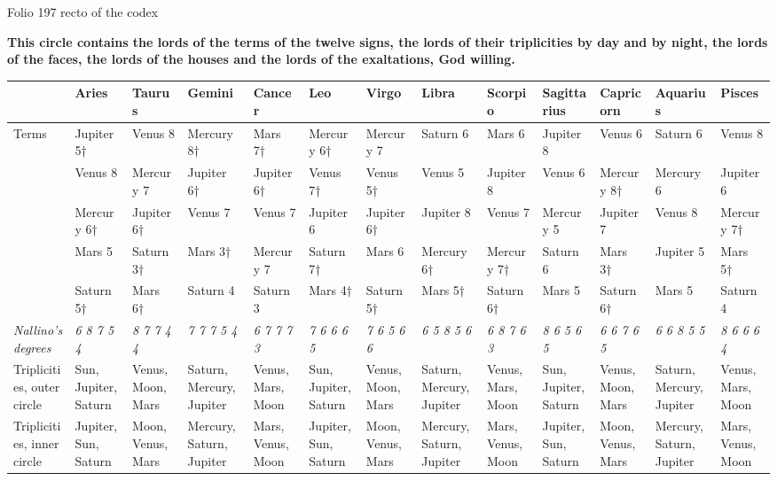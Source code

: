 \begin{landscape}
{\centering\footnotesize Folio 197 recto of the codex\par}\smallskip
{\centering\bfseries This circle contains the lords of the terms of the twelve signs, the lords of their triplicities by day and by night, the lords of the faces, the lords of the houses and the lords of the exaltations, God willing.\par}\medskip
{\footnotesize\setlength{\tabcolsep}{2.5pt}\begin{longtable}{L{30mm}L{15.5mm}L{15.5mm}L{15.5mm}L{15.5mm}L{15.5mm}L{15.5mm}L{15.5mm}L{15.5mm}L{15.5mm}L{15.5mm}L{15.5mm}L{15.5mm}}
& \textbf{Aries} & \textbf{Taurus} & \textbf{Gemini} & \textbf{Cancer} & \textbf{Leo} & \textbf{Virgo} & \textbf{Libra} & \textbf{Scorpio} & \textbf{Sagittarius} & \textbf{Capricorn} & \textbf{Aquarius} & \textbf{Pisces}\\\hline\endhead
Terms & Jupiter 5† & Venus 8 & Mercury 8† & Mars 7† & Mercury 6† & Mercury 7 & Saturn 6 & Mars 6 & Jupiter 8 & Venus 6 & Saturn 6 & Venus 8\\
 & Venus 8 & Mercury 7 & Jupiter 6† & Jupiter 6† & Venus 7† & Venus 5† & Venus 5 & Jupiter 8 & Venus 6 & Mercury 8† & Mercury 6 & Jupiter 6\\
 & Mercury 6† & Jupiter 6† & Venus 7 & Venus 7 & Jupiter 6 & Jupiter 6† & Jupiter 8 & Venus 7 & Mercury 5 & Jupiter 7 & Venus 8 & Mercury 7†\\
 & Mars 5 & Saturn 3† & Mars 3† & Mercury 7 & Saturn 7† & Mars 6 & Mercury 6† & Mercury 7† & Saturn 6 & Mars 3† & Jupiter 5 & Mars 5†\\
 & Saturn 5† & Mars 6† & Saturn 4 & Saturn 3 & Mars 4† & Saturn 5† & Mars 5† & Saturn 6† & Mars 5 & Saturn 6† & Mars 5 & Saturn 4\\
\emph{Nallino's degrees} & \emph{6 8 7 5 4} & \emph{8 7 7 4 4} & \emph{7 7 7 5 4} & \emph{6 7 7 7 3} & \emph{7 6 6 6 5} & \emph{7 6 5 6 6} & \emph{6 5 8 5 6} & \emph{6 8 7 6 3} & \emph{8 6 5 6 5} & \emph{6 6 7 6 5} & \emph{6 6 8 5 5} & \emph{8 6 6 6 4}\\
Triplicities, outer circle & Sun, Jupiter, Saturn & Venus, Moon, Mars & Saturn, Mercury, Jupiter & Venus, Mars, Moon & Sun, Jupiter, Saturn & Venus, Moon, Mars & Saturn, Mercury, Jupiter & Venus, Mars, Moon & Sun, Jupiter, Saturn & Venus, Moon, Mars & Saturn, Mercury, Jupiter & Venus, Mars, Moon\\
Triplicities, inner circle & Jupiter, Sun, Saturn & Moon, Venus, Mars & Mercury, Saturn, Jupiter & Mars, Venus, Moon & Jupiter, Sun, Saturn & Moon, Venus, Mars & Mercury, Saturn, Jupiter & Mars, Venus, Moon & Jupiter, Sun, Saturn & Moon, Venus, Mars & Mercury, Saturn, Jupiter & Mars, Venus, Moon\\

\end{longtable}}
\end{landscape}

